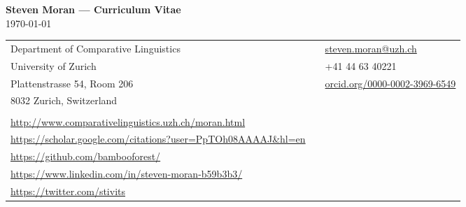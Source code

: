 \documentclass[11pt]{article}
\begin{document}
\pagestyle{empty}


\begin{center}
{\large \bf Steven Moran --- Curriculum Vitae}\\
\today\\

\vskip 12pt
\begin{tabular}{lll}
Department of Comparative Linguistics & & \href{mailto:steven.moran@uzh.ch}{steven.moran@uzh.ch} \\
University of Zurich & & +41 44 63 40221 \\
Plattenstrasse 54, Room 206 & & \small\url{orcid.org/0000-0002-3969-6549} \\
8032 Zurich, Switzerland & & \\
& & \\
\small\url{http://www.comparativelinguistics.uzh.ch/moran.html} & & \\
\small\url{https://scholar.google.com/citations?user=PpTOh08AAAAJ&hl=en} & & \\
\small\url{https://github.com/bambooforest/} & & \\
\small\url{https://www.linkedin.com/in/steven-moran-b59b3b3/} & & \\
\small\url{https://twitter.com/stivits} & & \
\end{tabular}
\end{center}

% 

\begin{comment}
\vskip 12pt
\begin{tabular}{lll}
Birthdate: 09.09.1979 && \\
Marital status: Single && \\
Nationality: USA && \\
Email: stiv@uw.edu && \\
Department of Linguistics & &\\
University of Washington & &\\
Box 354340 && \\
Seattle, WA 98195--4340 & & \\
\end{tabular}
\end{center}
\end{comment}
\end{document}
